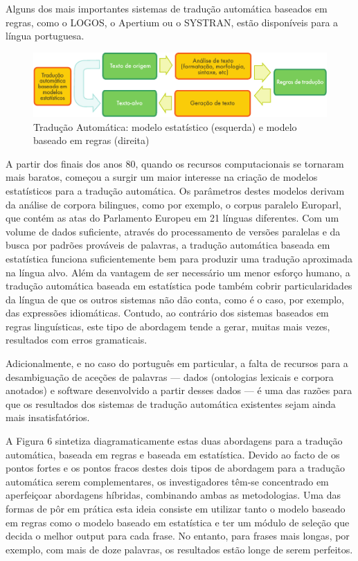 \begin{multicols}{2}
Alguns dos mais importantes sistemas de tradução automática baseados em regras, como o LOGOS, o Apertium ou o SYSTRAN, estão disponíveis para a língua portuguesa.

\begin{figure}[htb]
  \center
  \includegraphics[width=\textwidth]{../_media/portuguese/machine_translation}
  \caption{Tradução Automática: modelo estatístico (esquerda) e modelo baseado em regras (direita)}
  \label{fig:mtarch_de}
\end{figure}

A partir dos finais dos anos 80, quando os recursos computacionais se tornaram mais baratos, 
começou a surgir um maior interesse na criação de modelos estatísticos para a tradução automática. 
Os parâmetros destes modelos derivam da análise de corpora bilingues, como por exemplo, o corpus paralelo Europarl, 
que contém as atas do Parlamento Europeu em 21 línguas diferentes. 
Com um volume de dados suficiente, através do processamento de versões paralelas 
e da busca por padrões prováveis de palavras, a tradução automática baseada em estatística funciona suficientemente bem 
para produzir uma tradução aproximada na língua alvo. 
Além da vantagem de ser necessário um menor esforço humano, a tradução automática baseada 
em estatística pode também cobrir particularidades da língua de que os outros sistemas não dão conta, 
como é o caso, por exemplo, das expressões idiomáticas.
Contudo, ao contrário dos sistemas baseados em regras linguísticas, este tipo de abordagem 
tende a gerar, muitas mais vezes, resultados com erros gramaticais.

Adicionalmente, e no caso do português em particular, a falta de recursos 
para a desambiguação de aceções de palavras --- dados (ontologias lexicais e corpora anotados) e software desenvolvido a partir desses dados --- é uma das razões 
para que os resultados dos sistemas de tradução automática existentes 
sejam ainda mais insatisfatórios.

A Figura 6 sintetiza diagramaticamente estas duas abordagens para a tradução automática, baseada em regras e baseada em estatística. Devido ao facto de os pontos fortes e os pontos fracos destes dois tipos de abordagem para a tradução automática serem complementares, os investigadores têm-se concentrado em aperfeiçoar abordagens híbridas, combinando ambas as metodologias. 
Uma das formas de pôr em prática esta ideia consiste em utilizar tanto o modelo baseado em regras como o modelo baseado em estatística e ter um módulo de seleção que decida o melhor output para cada frase. 
No entanto, para frases mais longas, por exemplo, com mais de doze palavras, os resultados estão longe de serem perfeitos.  


\end{multicols}
